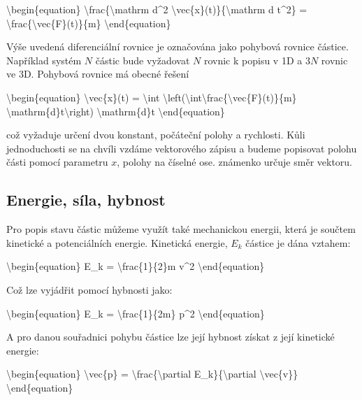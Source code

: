 \documentclass[letterpaper,10pt,english]{jupyterBook}
\begin{document}
\sphinxAtStartPar
\textbackslash{}begin\{equation\}
\textbackslash{}frac\{\textbackslash{}mathrm d\textasciicircum{}2 \textbackslash{}vec\{x\}(t)\}\{\textbackslash{}mathrm d t\textasciicircum{}2\} = \textbackslash{}frac\{\textbackslash{}vec\{F\}(t)\}\{m\}
\textbackslash{}end\{equation\}

\sphinxAtStartPar
Výše uvedená diferenciální rovnice je označována jako pohybová rovnice částice. Například systém \(N\) částic bude vyžadovat \(N\) rovnic k popisu v 1D a \(3N\) rovnic ve 3D. Pohybová rovnice má obecné řešení

\sphinxAtStartPar
\textbackslash{}begin\{equation\}
\textbackslash{}vec\{x\}(t) = \textbackslash{}int \textbackslash{}left(\textbackslash{}int\textbackslash{}frac\{\textbackslash{}vec\{F\}(t)\}\{m\} \textbackslash{}mathrm\{d\}t\textbackslash{}right) \textbackslash{}mathrm\{d\}t
\textbackslash{}end\{equation\}

\sphinxAtStartPar
což vyžaduje určení dvou konstant, počáteční polohy a rychlosti. Kůli jednoduchosti se na chvíli vzdáme vektorového zápisu a budeme popisovat polohu části pomocí parametru \(x\), polohy na číselné ose. známenko určuje směr vektoru.


\subsection{Energie, síla, hybnost}
\label{\detokenize{Prednasky/1_5_Lagrange_Eulerovy_rovnice:energie-sila-hybnost}}
\sphinxAtStartPar
Pro popis stavu částic můžeme využít také mechanickou energii, která je součtem kinetické a potenciálních energie. Kinetická energie, \(E_k\) částice je dána vztahem:

\sphinxAtStartPar
\textbackslash{}begin\{equation\}
E\_k = \textbackslash{}frac\{1\}\{2\}m v\textasciicircum{}2
\textbackslash{}end\{equation\}

\sphinxAtStartPar
Což lze vyjádřit pomocí hybnosti jako:

\sphinxAtStartPar
\textbackslash{}begin\{equation\}
E\_k = \textbackslash{}frac\{1\}\{2m\} p\textasciicircum{}2
\textbackslash{}end\{equation\}

\sphinxAtStartPar
A pro danou souřadnici pohybu částice lze její hybnost získat z její kinetické energie:

\sphinxAtStartPar
\textbackslash{}begin\{equation\}
\textbackslash{}vec\{p\} = \textbackslash{}frac\{\textbackslash{}partial E\_k\}\{\textbackslash{}partial \textbackslash{}vec\{v\}\}
\textbackslash{}end\{equation\}
\end{document}
